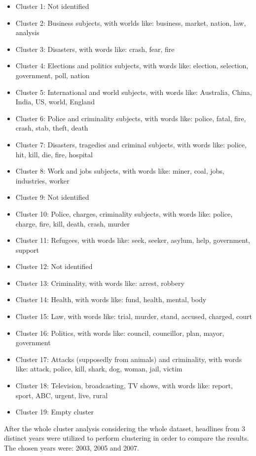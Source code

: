 \documentclass[10pt,twocolumn,letterpaper]{article}
\begin{document}
\begin{itemize}
	\item Cluster 1: Not identified
	\item Cluster 2: Business subjects, with worlds like: business, market, nation, law, analysis
	\item Cluster 3: Disasters, with words like: crash, fear, fire
	\item Cluster 4: Elections and politics subjects, with words like: election, selection, government, poll, nation
	\item Cluster 5: International and world subjects, with words like: Australia, China, India, US, world, England
	\item Cluster 6: Police and criminality subjects, with words like: police, fatal, fire, crash, stab, theft, death
	\item Cluster 7: Disasters, tragedies and criminal subjects, with words like: police, hit, kill, die, fire, hospital
	\item Cluster 8: Work and jobs subjects, with words like: miner, coal, jobs, industries, worker
	\item Cluster 9: Not identified
	\item Cluster 10: Police, charges, criminality subjects, with words like: police, charge, fire, kill, death, crash, murder
	\item Cluster 11: Refugees, with words like: seek, seeker, asylum, help, government, support
	\item Cluster 12: Not identified
	\item Cluster 13: Criminality, with words like: arrest, robbery
	\item Cluster 14: Health, with words like: fund, health, mental, body
	\item Cluster 15: Law, with words like: trial, murder, stand, accused, charged, court
	\item Cluster 16: Politics, with words like: council, councillor, plan, mayor, government
	\item Cluster 17: Attacks (supposedly from animals) and criminality, with words like: attack, police, kill, shark, dog, woman, jail, victim
	\item Cluster 18: Television, broadcasting, TV shows, with words like: report, sport, ABC, urgent, live, rural
	\item Cluster 19: Empty cluster
\end{itemize}

After the whole cluster analysis considering the whole dataset, headlines from 3 distinct years were utilized to perform clustering in order to compare the results. The chosen years were: 2003, 2005 and 2007.
\end{document}
